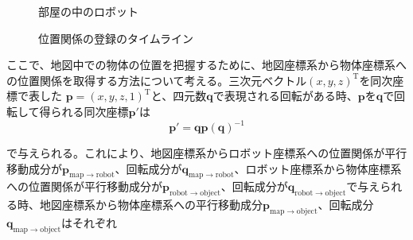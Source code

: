 \documentclass[a4paper]{jreport}	%
\begin{document}
\begin{figure}[h] 
\caption{部屋の中のロボット}
\label{fig:room}
\end{figure}

\begin{figure}[h] 
\caption{位置関係の登録のタイムライン}
\label{fig:sensor-sync}
\end{figure}


ここで、地図中での物体の位置を把握するために、地図座標系から物体座標系への位置関係を取得する方法について考える。三次元ベクトル$(x, y, z)^{\mathrm{T}}$を同次座標で表した $\mathbf{p} = (x, y, z, 1)^{\mathrm{T}}$と、四元数$\mathbf{q}$で表現される回転がある時、$\mathbf{p}$を$\mathbf{q}$で回転して得られる同次座標$\mathbf{p'}$は
\begin{equation}
	\mathbf{p'} = \mathbf{qp}(\mathbf{q})^{-1}
\end{equation}

で与えられる。これにより、地図座標系からロボット座標系への位置関係が平行移動成分が$\mathbf{p}_{\mathrm{map \rightarrow robot}}$、回転成分が$\mathbf{q}_{\mathrm{map \rightarrow  robot}}$、ロボット座標系から物体座標系への位置関係が平行移動成分が$\mathbf{p}_{\mathrm{robot \rightarrow object}}$、回転成分が$\mathbf{q}_{\mathrm{robot \rightarrow object}}$で与えられる時、地図座標系から物体座標系への平行移動成分$\mathbf{p}_{\mathrm{map \rightarrow object}}$、回転成分$\mathbf{q}_{\mathrm{map \rightarrow object}}$はそれぞれ
\end{document}
